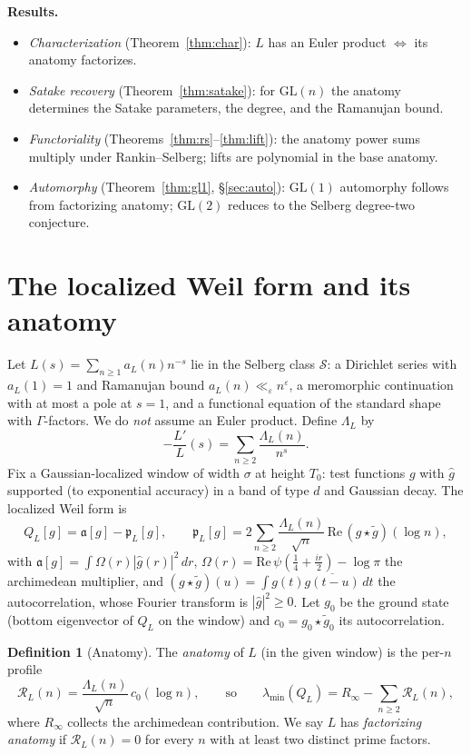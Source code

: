 \documentclass[11pt]{amsart}
\theoremstyle{definition}
\newtheorem{definition}[theorem]{Definition}
\theoremstyle{remark}
\newcommand{\fa}{\mathfrak a}
\newcommand{\fp}{\mathfrak p}
\newcommand{\cR}{\mathcal R}
\newcommand{\cS}{\mathcal S}
\newcommand{\GL}{\mathrm{GL}}
\begin{document}
\medskip\noindent\textbf{Results.}
\begin{itemize}
\item[(I)] \emph{Characterization} (Theorem~\ref{thm:char}): $L$ has an Euler
product $\iff$ its anatomy factorizes.
\item[(II)] \emph{Satake recovery} (Theorem~\ref{thm:satake}): for $\GL(n)$ the
anatomy determines the Satake parameters, the degree, and the Ramanujan bound.
\item[(III)] \emph{Functoriality} (Theorems~\ref{thm:rs}--\ref{thm:lift}): the
anatomy power sums multiply under Rankin--Selberg; lifts are polynomial in the
base anatomy.
\item[(IV)] \emph{Automorphy} (Theorem~\ref{thm:gl1}, \S\ref{sec:auto}): $\GL(1)$
automorphy follows from factorizing anatomy; $\GL(2)$ reduces to the Selberg
degree-two conjecture.
\end{itemize}

\section{The localized Weil form and its anatomy}\label{sec:setup}
Let $L(s)=\sum_{n\ge1}a_L(n)n^{-s}$ lie in the Selberg class $\cS$: a Dirichlet
series with $a_L(1)=1$ and Ramanujan bound $a_L(n)\ll_\varepsilon n^\varepsilon$,
a meromorphic continuation with at most a pole at $s=1$, and a functional
equation of the standard shape with $\Gamma$-factors. We do \emph{not} assume an
Euler product. Define $\Lambda_L$ by
\[
-\frac{L'}{L}(s)=\sum_{n\ge2}\frac{\Lambda_L(n)}{n^{s}}.
\]
Fix a Gaussian-localized window of width $\sigma$ at height $T_0$: test functions
$g$ with $\widehat g$ supported (to exponential accuracy) in a band of type $d$
and Gaussian decay. The localized Weil form is
\[
Q_L[g]=\fa[g]-\fp_L[g],\qquad
\fp_L[g]=2\sum_{n\ge2}\frac{\Lambda_L(n)}{\sqrt n}\,\mathrm{Re}\,(g\star\tilde g)(\log n),
\]
with $\fa[g]=\int\Omega(r)|\widehat g(r)|^2\,dr$, $\Omega(r)=\mathrm{Re}\,
\psi(\tfrac14+\tfrac{ir}2)-\log\pi$ the archimedean multiplier, and
$(g\star\tilde g)(u)=\int g(t)\overline{g(t-u)}\,dt$ the autocorrelation, whose
Fourier transform is $|\widehat g|^2\ge0$. Let $g_0$ be the ground state (bottom
eigenvector of $Q_L$ on the window) and $c_0=g_0\star\tilde g_0$ its
autocorrelation.

\begin{definition}[Anatomy]\label{def:anat}
The \emph{anatomy} of $L$ (in the given window) is the per-$n$ profile
\[
\cR_L(n)=\frac{\Lambda_L(n)}{\sqrt n}\,c_0(\log n),\qquad\text{so}\qquad
\lambda_{\min}(Q_L)=R_\infty-\sum_{n\ge2}\cR_L(n),
\]
where $R_\infty$ collects the archimedean contribution. We say $L$ has
\emph{factorizing anatomy} if $\cR_L(n)=0$ for every $n$ with at least two
distinct prime factors.
\end{definition}
\end{document}

